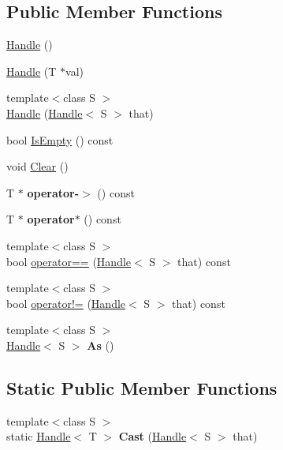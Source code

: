 \subsection*{Public Member Functions}
\begin{DoxyCompactItemize}
\item 
\hyperlink{classv8_1_1_handle_aa7543a3d572565806a66e922634cc2f4}{Handle} ()
\item 
\hyperlink{classv8_1_1_handle_aac16277f1131898a4a2ef664d051cc18}{Handle} (T $\ast$val)
\item 
{\footnotesize template$<$class S $>$ }\\\hyperlink{classv8_1_1_handle_a64aee8fcde243c8a5abebfe534b3797a}{Handle} (\hyperlink{classv8_1_1_handle}{Handle}$<$ S $>$ that)
\item 
bool \hyperlink{classv8_1_1_handle_ab3b20b28e7f672de83a2dc8d6809f815}{Is\+Empty} () const 
\item 
void \hyperlink{classv8_1_1_handle_a452516a09df056438c3d3a177ebd1977}{Clear} ()
\item 
\hypertarget{classv8_1_1_handle_af5285c2e91079e380651f83195383228}{}T $\ast$ {\bfseries operator-\/$>$} () const \label{classv8_1_1_handle_af5285c2e91079e380651f83195383228}

\item 
\hypertarget{classv8_1_1_handle_a524a50d9802a97beb1b5e405c6fc6f21}{}T $\ast$ {\bfseries operator$\ast$} () const \label{classv8_1_1_handle_a524a50d9802a97beb1b5e405c6fc6f21}

\item 
{\footnotesize template$<$class S $>$ }\\bool \hyperlink{classv8_1_1_handle_afcc79738c6fff05c70e958a471f2b7d9}{operator==} (\hyperlink{classv8_1_1_handle}{Handle}$<$ S $>$ that) const 
\item 
{\footnotesize template$<$class S $>$ }\\bool \hyperlink{classv8_1_1_handle_ab550353b4a7bc3ad3df53fe80df7ea61}{operator!=} (\hyperlink{classv8_1_1_handle}{Handle}$<$ S $>$ that) const 
\item 
\hypertarget{classv8_1_1_handle_a1cfaea378fc1a419101d4cc02d34e404}{}{\footnotesize template$<$class S $>$ }\\\hyperlink{classv8_1_1_handle}{Handle}$<$ S $>$ {\bfseries As} ()\label{classv8_1_1_handle_a1cfaea378fc1a419101d4cc02d34e404}

\end{DoxyCompactItemize}
\subsection*{Static Public Member Functions}
\begin{DoxyCompactItemize}
\item 
\hypertarget{classv8_1_1_handle_a78abe2e84ab0829779b714feea1bc4d1}{}{\footnotesize template$<$class S $>$ }\\static \hyperlink{classv8_1_1_handle}{Handle}$<$ T $>$ {\bfseries Cast} (\hyperlink{classv8_1_1_handle}{Handle}$<$ S $>$ that)\label{classv8_1_1_handle_a78abe2e84ab0829779b714feea1bc4d1}

\end{DoxyCompactItemize}


